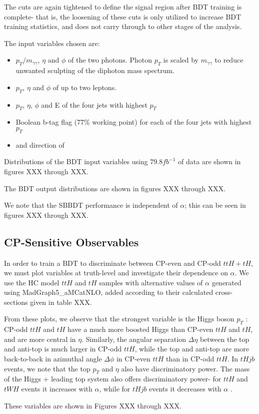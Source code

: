 The cuts are again tightened to define the signal region after BDT training is complete- that is, the loosening of these cuts is only utilized to increase BDT training statistics, and does not carry through to other stages of the analysis.

The input variables chosen are: 

\begin{itemize}
\item $p_T/m_{\gamma \gamma}$, $\eta$ and $\phi$ of the two photons. Photon $p_{T}$ is scaled by $m_{\gamma \gamma}$ to reduce unwanted sculpting of the diphoton mass spectrum.
\item $p_T$, $\eta$ and $\phi$ of up to two leptons. 
\item $p_T$, $\eta$, $\phi$ and E of the four jets with highest $p_{T}$
\item Boolean b-tag flag (77\% working point) for each of the four jets with highest $p_{T}$
\item \MET and direction of \MET
\end{itemize}

Distributions of the BDT input variables using $79.8 fb^{-1}$ of data are shown in figures XXX through XXX.

The BDT output distributions are shown in figures XXX through XXX.

We note that the SBBDT performance is independent of $\alpha$; this can be seen in figures XXX through XXX.

\subsection{CP-Sensitive Observables}

In order to train a BDT to discriminate between CP-even and CP-odd $ttH+tH$, we must plot variables at truth-level and investigate their dependence on $\alpha$. We use the HC model $ttH$ and $tH$ samples with alternative values of $\alpha$ generated using MadGraph5_aMCatNLO, added according to their calculated cross-sections given in table XXX.

From these plots, we observe that the strongest variable is the Higgs boson $p_{T}$ : CP-odd $ttH$ and $tH$ have a much more boosted Higgs than CP-even $ttH$ and $tH$, and are more central in $\eta$. Similarly, the angular separation $\Delta \eta$ between the top and anti-top is much larger in CP-odd $ttH$, while the top and anti-top are more back-to-back in azimuthal angle $\Delta \phi$ in CP-even $ttH$ than in CP-odd $ttH$. In $tHjb$ events, we note that the top $p_{T}$ and $\eta$ also have discriminatory power. The mass of the Higgs + leading top system also offers discriminatory power- for $ttH$ and $tWH$ events it increases with $\alpha$, while for $tHjb$ events it decreases with $\alpha$ .

These variables are shown in Figures XXX through XXX.










